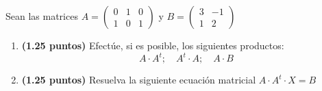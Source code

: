 
Sean las matrices $A=\begin{pmatrix}0&1&0\\1&0&1\end{pmatrix}$ y $B=\begin{pmatrix}3&-1\\1&2\end{pmatrix}$
\begin{enumerate}[label=\alph*)]
\item \textbf{(1.25 puntos)} Efectúe, si es posible, los siguientes productos:
\[
A\cdot A^t;\quad A^t\cdot A;\quad A\cdot B
\]
\item \textbf{(1.25 puntos)} Resuelva la siguiente ecuación matricial $A\cdot A^t\cdot X=B$
\end{enumerate}
